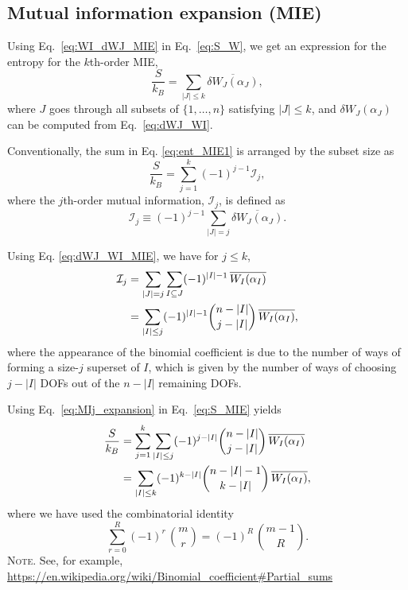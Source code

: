 \documentclass[preprint, superscriptaddress]{revtex4-1}
\newcommand{\note}[1]{{\color{DarkGreen}\footnotesize \textsc{Note.} #1}}
\newcommand{\MI}{\mathcal I} %
\begin{document}
\subsection{Mutual information expansion (MIE)}


Using Eq.~\eqref{eq:WI_dWJ_MIE} in Eq.~\eqref{eq:S_W},
we get an expression for the entropy for the $k$th-order MIE,
\begin{equation}
  \frac{S}{k_B}
  =
  \sum_{|J| \le k} \overline{ \delta W_J(\alpha_J) },
  \label{eq:ent_MIE1}
\end{equation}
where $J$ goes through all subsets of $\{1, \dots, n\}$ satisfying $|J| \le k$,
and $\delta W_J(\alpha_J)$ can be computed from Eq.~\eqref{eq:dWJ_WI}.

Conventionally, the sum in Eq. \eqref{eq:ent_MIE1}
is arranged by the subset size as
\begin{equation}
  \frac{S}{k_B}
  =
  \sum_{j = 1}^k (-1)^{j-1} \MI_j
  ,
  \label{eq:S_MIE}
\end{equation}
%
where the $j$th-order mutual information, $\MI_j$, is defined as
$$
\MI_j \equiv (-1)^{j-1} \sum_{|J| = j} \overline{ \delta W_J(\alpha_J) }.
$$

Using Eq. \eqref{eq:dWJ_WI_MIE}, we have for $j \le k$,
\begin{align}
  \MI_j
  &=
  \sum_{ |J| = j }
  \sum_{ I \subseteq J }
  (-1)^{|I| - 1}
  \, \overline{ W_I(\alpha_I) }
  \notag \\
  &=
  \sum_{ |I| \le j }
  (-1)^{|I| - 1}
  {n - |I| \choose j - |I|}
  \, \overline{ W_I(\alpha_I) }
  ,
  \label{eq:MIj_expansion}
\end{align}
%
where the appearance of the binomial coefficient
is due to the number of ways of forming
a size-$j$ superset of $I$,
which is given by the number of ways of choosing
$j - |I|$ DOFs out of the $n - |I|$ remaining DOFs.

Using Eq.~\eqref{eq:MIj_expansion} in Eq.~\eqref{eq:S_MIE} yields
%
\begin{align}
  \frac{S}{k_B}
  &=
  \sum_{j=1}^k
  \sum_{|I| \le j}
  (-1)^{j - |I|}
  {n - |I| \choose j - |I|}
  \, \overline{ W_I(\alpha_I) }
  \notag\\
  &=
  \sum_{|I| \le k}
  (-1)^{ k - |I| }
  {n - |I| - 1 \choose k - |I|}
  \, \overline{ W_I(\alpha_I) }
  ,
  \notag
\end{align}
%
where we have used the combinatorial identity
$$
\sum_{r = 0}^R (-1)^r \, {m \choose r}
=
(-1)^R \, {m - 1 \choose R}.
$$
\note{ See, for example, \url{https://en.wikipedia.org/wiki/Binomial\_coefficient\#Partial\_sums} }
\end{document}
